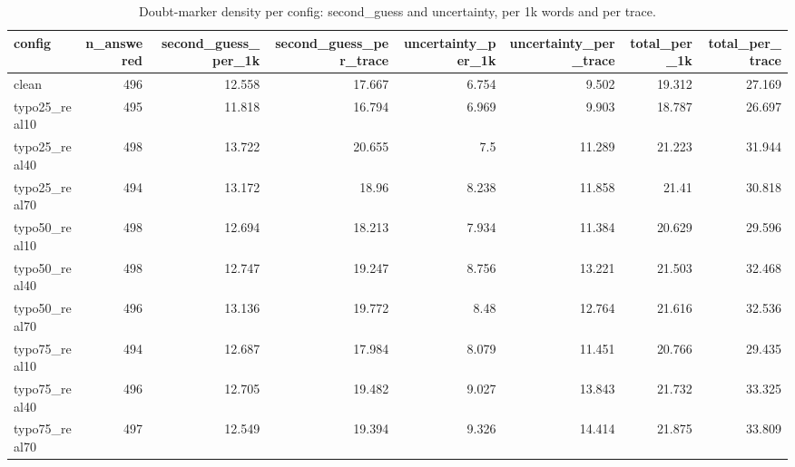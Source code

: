 \documentclass[11pt]{article}
\begin{document}
\begin{table}[H]
\centering
\caption{Doubt-marker density per config: second\_guess and uncertainty, per 1k words and per trace.}
\small
\begin{adjustbox}{max width=\textwidth}
\begin{tabular}{lrrrrrrr}
\toprule
\textbf{config} & \textbf{n\_answered} & \textbf{second\_guess\_per\_1k} & \textbf{second\_guess\_per\_trace} & \textbf{uncertainty\_per\_1k} & \textbf{uncertainty\_per\_trace} & \textbf{total\_per\_1k} & \textbf{total\_per\_trace} \\
\midrule
clean & 496 & 12.558 & 17.667 & 6.754 & 9.502 & 19.312 & 27.169 \\
typo25\_real10 & 495 & 11.818 & 16.794 & 6.969 & 9.903 & 18.787 & 26.697 \\
typo25\_real40 & 498 & 13.722 & 20.655 & 7.5 & 11.289 & 21.223 & 31.944 \\
typo25\_real70 & 494 & 13.172 & 18.96 & 8.238 & 11.858 & 21.41 & 30.818 \\
typo50\_real10 & 498 & 12.694 & 18.213 & 7.934 & 11.384 & 20.629 & 29.596 \\
typo50\_real40 & 498 & 12.747 & 19.247 & 8.756 & 13.221 & 21.503 & 32.468 \\
typo50\_real70 & 496 & 13.136 & 19.772 & 8.48 & 12.764 & 21.616 & 32.536 \\
typo75\_real10 & 494 & 12.687 & 17.984 & 8.079 & 11.451 & 20.766 & 29.435 \\
typo75\_real40 & 496 & 12.705 & 19.482 & 9.027 & 13.843 & 21.732 & 33.325 \\
typo75\_real70 & 497 & 12.549 & 19.394 & 9.326 & 14.414 & 21.875 & 33.809 \\
\bottomrule
\end{tabular}
\end{adjustbox}
\end{table}
\end{document}
